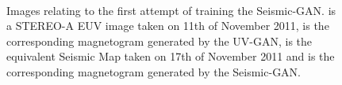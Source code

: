 \documentclass[11pt,a4paper,onecolumn]{report}
\begin{document}
\begin{figure}[t]%
  \centering
  \\%
  \caption[]{Images relating to the first attempt of training the Seismic-GAN.
   is a STEREO-A EUV image taken on 11th of November 2011,
   is the corresponding magnetogram generated by
  the UV-GAN,  is the equivalent Seismic Map taken
  on 17th of November 2011 and
   is the corresponding magnetogram generated by the
  Seismic-GAN.}
  \label{fig:default}
\end{figure}
\end{document}
